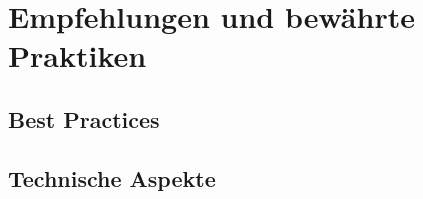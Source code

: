 \chapter{Empfehlungen und bewährte Praktiken}
\label{sec:approach}

\section{Best Practices}

\section{Technische Aspekte}